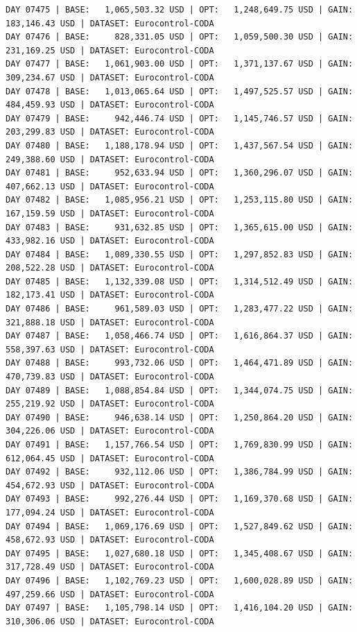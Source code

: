 \documentclass[11pt,a4paper]{article}
\begin{document}
\begin{verbatim}
DAY 07475 | BASE:   1,065,503.32 USD | OPT:   1,248,649.75 USD | GAIN: 183,146.43 USD | DATASET: Eurocontrol-CODA
DAY 07476 | BASE:     828,331.05 USD | OPT:   1,059,500.30 USD | GAIN: 231,169.25 USD | DATASET: Eurocontrol-CODA
DAY 07477 | BASE:   1,061,903.00 USD | OPT:   1,371,137.67 USD | GAIN: 309,234.67 USD | DATASET: Eurocontrol-CODA
DAY 07478 | BASE:   1,013,065.64 USD | OPT:   1,497,525.57 USD | GAIN: 484,459.93 USD | DATASET: Eurocontrol-CODA
DAY 07479 | BASE:     942,446.74 USD | OPT:   1,145,746.57 USD | GAIN: 203,299.83 USD | DATASET: Eurocontrol-CODA
DAY 07480 | BASE:   1,188,178.94 USD | OPT:   1,437,567.54 USD | GAIN: 249,388.60 USD | DATASET: Eurocontrol-CODA
DAY 07481 | BASE:     952,633.94 USD | OPT:   1,360,296.07 USD | GAIN: 407,662.13 USD | DATASET: Eurocontrol-CODA
DAY 07482 | BASE:   1,085,956.21 USD | OPT:   1,253,115.80 USD | GAIN: 167,159.59 USD | DATASET: Eurocontrol-CODA
DAY 07483 | BASE:     931,632.85 USD | OPT:   1,365,615.00 USD | GAIN: 433,982.16 USD | DATASET: Eurocontrol-CODA
DAY 07484 | BASE:   1,089,330.55 USD | OPT:   1,297,852.83 USD | GAIN: 208,522.28 USD | DATASET: Eurocontrol-CODA
DAY 07485 | BASE:   1,132,339.08 USD | OPT:   1,314,512.49 USD | GAIN: 182,173.41 USD | DATASET: Eurocontrol-CODA
DAY 07486 | BASE:     961,589.03 USD | OPT:   1,283,477.22 USD | GAIN: 321,888.18 USD | DATASET: Eurocontrol-CODA
DAY 07487 | BASE:   1,058,466.74 USD | OPT:   1,616,864.37 USD | GAIN: 558,397.63 USD | DATASET: Eurocontrol-CODA
DAY 07488 | BASE:     993,732.06 USD | OPT:   1,464,471.89 USD | GAIN: 470,739.83 USD | DATASET: Eurocontrol-CODA
DAY 07489 | BASE:   1,088,854.84 USD | OPT:   1,344,074.75 USD | GAIN: 255,219.92 USD | DATASET: Eurocontrol-CODA
DAY 07490 | BASE:     946,638.14 USD | OPT:   1,250,864.20 USD | GAIN: 304,226.06 USD | DATASET: Eurocontrol-CODA
DAY 07491 | BASE:   1,157,766.54 USD | OPT:   1,769,830.99 USD | GAIN: 612,064.45 USD | DATASET: Eurocontrol-CODA
DAY 07492 | BASE:     932,112.06 USD | OPT:   1,386,784.99 USD | GAIN: 454,672.93 USD | DATASET: Eurocontrol-CODA
DAY 07493 | BASE:     992,276.44 USD | OPT:   1,169,370.68 USD | GAIN: 177,094.24 USD | DATASET: Eurocontrol-CODA
DAY 07494 | BASE:   1,069,176.69 USD | OPT:   1,527,849.62 USD | GAIN: 458,672.93 USD | DATASET: Eurocontrol-CODA
DAY 07495 | BASE:   1,027,680.18 USD | OPT:   1,345,408.67 USD | GAIN: 317,728.49 USD | DATASET: Eurocontrol-CODA
DAY 07496 | BASE:   1,102,769.23 USD | OPT:   1,600,028.89 USD | GAIN: 497,259.66 USD | DATASET: Eurocontrol-CODA
DAY 07497 | BASE:   1,105,798.14 USD | OPT:   1,416,104.20 USD | GAIN: 310,306.06 USD | DATASET: Eurocontrol-CODA

\end{verbatim}
\end{document}
